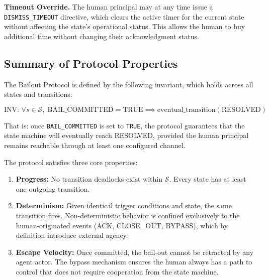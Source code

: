 \bigskip

\bigskip

\noindent\textbf{Timeout Override.} The human principal may at any time issue a \texttt{DISMISS\_TIMEOUT} directive, which clears the active timer for the current state without affecting the state's operational status. This allows the human to buy additional time without changing their acknowledgment status.

\bigskip

\subsection{Summary of Protocol Properties}

\bigskip

The Bailout Protocol is defined by the following invariant, which holds across all states and transitions:

\[
\text{INV: } \forall s \in \mathcal{S}, \; \text{BAIL\_COMMITTED} = \text{TRUE} \implies \text{eventual\_transition}(\text{RESOLVED})
\]

That is: once \texttt{BAIL\_COMMITTED} is set to \texttt{TRUE}, the protocol guarantees that the state machine will eventually reach RESOLVED, provided the human principal remains reachable through at least one configured channel.

\bigskip

The protocol satisfies three core properties:

\begin{enumerate}
  \item \textbf{Progress:} No transition deadlocks exist within $\mathcal{S}$. Every state has at least one outgoing transition.
  \item \textbf{Determinism:} Given identical trigger conditions and state, the same transition fires. Non-deterministic behavior is confined exclusively to the human-originated events (ACK, CLOSE\_OUT, BYPASS), which by definition introduce external agency.
  \item \textbf{Escape Velocity:} Once committed, the bail-out cannot be retracted by any agent actor. The bypass mechanism ensures the human always has a path to control that does not require cooperation from the state machine.
\end{enumerate}
